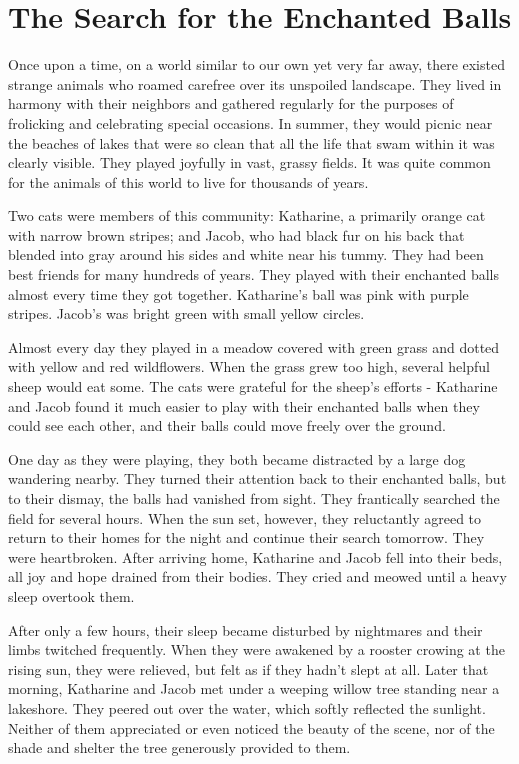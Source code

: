 \chapter{The Search for the Enchanted Balls}
\setlength{\parindent}{2em}
\Large
{}\baselineskip

Once upon a time, on a world similar to our own yet very far away, there existed strange animals who roamed carefree over its unspoiled landscape. They lived in harmony with their neighbors and gathered regularly for the purposes of frolicking and celebrating special occasions. In summer, they would picnic near the beaches of lakes that were so clean that all the life that swam within it was clearly visible. They played joyfully in vast, grassy fields. It was quite common for the animals of this world to live for thousands of years.

Two cats were members of this community: Katharine, a primarily orange cat with narrow brown stripes; and Jacob, who had black fur on his back that blended into gray around his sides and white near his tummy. They had been best friends for many hundreds of years. They played with their enchanted balls almost every time they got together. Katharine's ball was pink with purple stripes. Jacob's was bright green with small yellow circles.

Almost every day they played in a meadow covered with green grass and dotted with yellow and red wildflowers. When the grass grew too high, several helpful sheep would eat some. The cats were grateful for the sheep’s efforts - Katharine and Jacob found it much easier to play with their enchanted balls when they could see each other, and their balls could move freely over the ground.

One day as they were playing, they both became distracted by a large dog wandering nearby. They turned their attention back to their enchanted balls, but to their dismay, the balls had vanished from sight. They frantically searched the field for several hours. When the sun set, however, they reluctantly agreed to return to their homes for the night and continue their search tomorrow. They were heartbroken. After arriving home, Katharine and Jacob fell into their beds, all joy and hope drained from their bodies. They cried and meowed until a heavy sleep overtook them.

After only a few hours, their sleep became disturbed by nightmares and their limbs twitched frequently. When they were awakened by a rooster crowing at the rising sun, they were relieved, but felt as if they hadn't slept at all. Later that morning, Katharine and Jacob met under a weeping willow tree standing near a lakeshore. They peered out over the water, which softly reflected the sunlight. Neither of them appreciated or even noticed the beauty of the scene, nor of the shade and shelter the tree generously provided to them.

